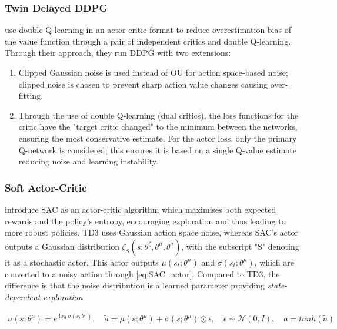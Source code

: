 \subsubsection{Twin Delayed DDPG}
\label{sec:TD3}


\cite{fujimoto2018addressing} use double Q-learning in an actor-critic format to reduce overestimation bias of the value function through a pair of independent critics and double Q-learning. Through their approach, they run DDPG with two extensions:
\begin{enumerate}
    \item Clipped Gaussian noise is used instead of OU for action space-based noise; clipped noise is chosen to prevent sharp action value changes causing over-fitting.
    \item Through the use of double Q-learning (dual critics), the loss functions for the critic have the "target critic changed" to the minimum between the networks, ensuring the most conservative estimate. For the actor loss, only the primary Q-network is considered; this ensures it is based on a single Q-value estimate reducing noise and learning instability.
\end{enumerate}

\subsubsection{Soft Actor-Critic}
\label{sec:SAC}

\cite{haarnoja2018soft} introduce SAC as an actor-critic algorithm which maximises both expected rewards and the policy's entropy, encouraging exploration and thus leading to more robust policies. 
TD3 uses Gaussian action space noise, whereas SAC's actor outputs a Gaussian distribution \(\zeta_S(s;\theta^{\tilde{\zeta}}, \theta^\mu, \theta^\sigma)\), with the subscript "S" denoting it as a stochastic actor. This actor outputs \(\mu(s_t; \theta^\mu)\) and \(\sigma(s_t; \theta^\mu)\), which are converted to a noisy action through \autoref{eq:SAC_actor}. Compared to TD3, the difference is that the noise distribution is a learned parameter providing \textit{state-dependent exploration}.

\begin{equation}
\begin{aligned}
    \sigma(s; \theta^\mu) = e^{\log \sigma(s; \theta^\mu)} ,\quad
    \tilde{a} = \mu(s; \theta^\mu) + \sigma(s; \theta^\mu) \odot \epsilon ,\quad
    \epsilon \sim \mathcal{N}(0,I) ,\quad
    a = tanh(\tilde{a})
\end{aligned}
\label{eq:SAC_actor}
\end{equation}

